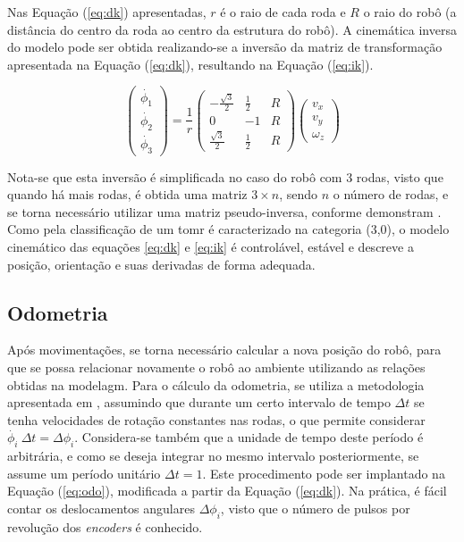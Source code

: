 Nas Equação (\ref{eq:dk}) apresentadas, $r$ é o raio de cada roda e $R$ o raio do robô (a distância do centro da roda ao centro da estrutura do robô). A cinemática inversa do modelo pode ser obtida realizando-se a inversão da matriz de transformação apresentada na Equação (\ref{eq:dk}), resultando na Equação (\ref{eq:ik}).


\begin{equation}
  \begin{pmatrix}
    \dot{\phi_1} \\
    \dot{\phi_2} \\
    \dot{\phi_3}
  \end{pmatrix}
  =
  \frac{1}{r}
  \begin{pmatrix}
    -\frac{\sqrt{3}}{2} & \frac{1}{2} & R \\
    0                   & -1          & R \\
    \frac{\sqrt{3}}{2}  & \frac{1}{2} & R
  \end{pmatrix}
  \begin{pmatrix}
    v_x \\
    v_y \\
    \omega_z
  \end{pmatrix}
  \label{eq:ik}
\end{equation}

Nota-se que esta inversão é simplificada no caso do robô com 3 rodas, visto que quando há mais rodas, é obtida uma matriz $3 \times n$, sendo $n$ o número de rodas, e se torna necessário utilizar uma matriz pseudo-inversa, conforme demonstram \citet{rojas2006holonomic}. Como pela classificação de \citet{campion1996structural} um \acrshort{tomr} é caracterizado na categoria (3,0), o modelo cinemático das equações \ref{eq:dk} e \ref{eq:ik} é controlável, estável e descreve a posição, orientação e suas derivadas de forma adequada. %

\subsection{Odometria}

Após movimentações, se torna necessário calcular a nova posição do robô, para que se possa relacionar novamente o robô ao ambiente utilizando as relações obtidas na modelagm. Para o cálculo da odometria, se utiliza a metodologia apresentada em \citet{lynch2017modern}, assumindo que durante um certo intervalo de tempo $\Delta t$ se tenha velocidades de rotação constantes nas rodas, o que permite considerar $\dot{\phi_i}\ \Delta t = \Delta \phi_i$. Considera-se também que a unidade de tempo deste período é arbitrária, e como se deseja integrar no mesmo intervalo posteriormente, se assume um período unitário $\Delta t = 1$. Este procedimento pode ser implantado na Equação (\ref{eq:odo}), modificada a partir da Equação (\ref{eq:dk}). Na prática, é fácil contar os deslocamentos angulares $\Delta \phi_i$, visto que o número de pulsos por revolução dos \textit{encoders} é conhecido.

